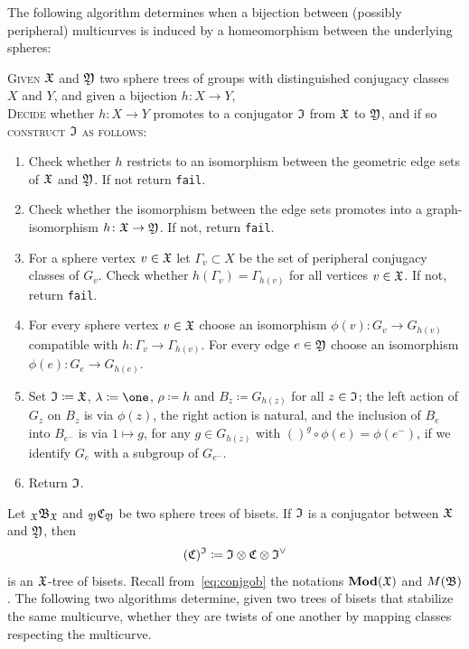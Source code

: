 \documentclass{amsart}
\begin{document}
The following algorithm determines when a bijection between (possibly
peripheral) multicurves is induced by a homeomorphism between the
underlying spheres:
\begin{algo}\label{algo:MarkCl:Prom}
  \textsc{Given} ${\mathfrak X}$ and ${\mathfrak Y}$ two sphere trees of
  groups with distinguished conjugacy classes $X$ and $Y$, and given a
  bijection $h\colon X\to Y$,\\
  \textsc{Decide} whether $h\colon X\to Y$ promotes to a conjugator
  ${\mathfrak I}$ from ${\mathfrak X}$ to ${\mathfrak Y}$, and if so
  \textsc{construct} ${\mathfrak I}$ \textsc{as follows:}\\\upshape
  \begin{enumerate}
  \item Check whether $h$ restricts to an isomorphism between the geometric
    edge sets of ${\mathfrak X}$ and ${\mathfrak Y}$. If not return \texttt{fail}.
  \item Check whether the isomorphism between the edge sets promotes
    into a graph-isomorphism $h\colon{\mathfrak X}\to{\mathfrak Y}$. If
    not, return \texttt{fail}.
  \item For a sphere vertex $v\in {\mathfrak X}$ let $\Gamma_v\subset X$ be the set
    of peripheral conjugacy classes of $G_v$. Check whether
    $h(\Gamma_v)=\Gamma_{h(v)}$ for all vertices $v\in {\mathfrak X}$. If
    not, return \texttt{fail}.
  \item For every sphere vertex $v\in{\mathfrak X}$ choose an isomorphism
    $\phi(v)\colon G_v\to G_{h(v)}$ compatible with $h\colon \Gamma_v\to
    \Gamma_{h(v)}$. For every edge $e\in {\mathfrak Y}$ choose an isomorphism
    $\phi(e)\colon G_e\to G_{h(e)}$.
  \item\label{algo:MarkCl:Prom:step5} Set ${\mathfrak I}\coloneqq {\mathfrak X}$,
    $\lambda\coloneqq\one$, $\rho\coloneqq h$ and
    $B_z\coloneqq G_{h(z)}$ for all $z\in {\mathfrak I}$; the left action of
    $G_z$ on $B_z$ is via $\phi(z)$, the right action is natural, and
    the inclusion of $B_e$ into $B_{e^-}$ is via $1\mapsto g$, for any
    $g\in G_{h(z)}$ with $()^g\circ\phi(e)=\phi(e^-)$, if we identify
    $G_e$ with a subgroup of $G_{e^-}$.
  \item Return ${\mathfrak I}$.
  \end{enumerate}
\end{algo}

Let $\subscript \gf\gfB_\gf$ and $\subscript \gfY\gfC_\gfY$ be two
sphere trees of bisets. If ${\mathfrak I}$ is a conjugator between ${\mathfrak X}$
and ${\mathfrak Y}$, then
\[({\mathfrak C})^{\mathfrak I}\coloneqq {\mathfrak I} \otimes {\mathfrak C}
\otimes {\mathfrak I}^{\vee}
\]
is an ${\mathfrak X}$-tree of bisets. Recall from~\eqref{eq:conjgob} the
notations $\mathbf{\relax Mod}({\mathfrak X})$ and $M({\mathfrak B})$. The following two algorithms
determine, given two trees of bisets that stabilize the same
multicurve, whether they are twists of one another by mapping classes
respecting the multicurve.
\end{document}
